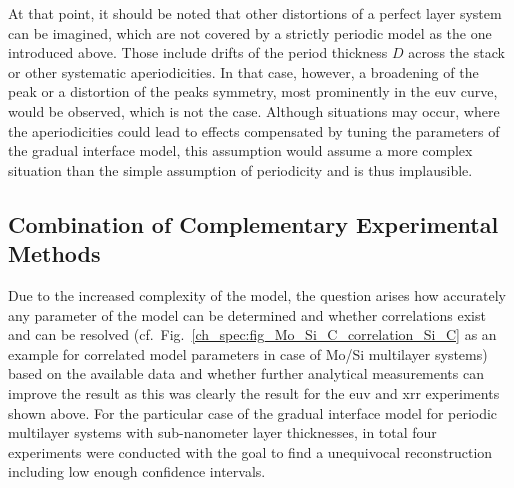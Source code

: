At that point, it should be noted that other distortions of a perfect layer system can be imagined, which are not covered by a strictly periodic model as the one introduced above. Those include drifts of the period thickness $D$ across the stack or other systematic aperiodicities. In that case, however, a broadening of the peak or a distortion of the peaks symmetry, most prominently in the \gls{euv} curve, would be observed, which is not the case. Although situations may occur, where the aperiodicities could lead to effects compensated by tuning the parameters of the gradual interface model, this assumption would assume a more complex situation than the simple assumption of periodicity and is thus implausible.

\subsection{Combination of Complementary Experimental Methods}
Due to the increased complexity of the model, the question arises how accurately any parameter of the model can be determined and whether correlations exist and can be resolved (cf.~Fig.~\ref{ch_spec:fig_Mo_Si_C_correlation_Si_C} as an example for correlated model parameters in case of Mo/Si multilayer systems) based on the available data and whether further analytical measurements can improve the result as this was clearly the result for the \gls{euv} and \gls{xrr} experiments shown above. For the particular case of the gradual interface model for periodic multilayer systems with sub-nanometer layer thicknesses, in total four experiments were conducted with the goal to find a unequivocal reconstruction including low enough confidence intervals. 

